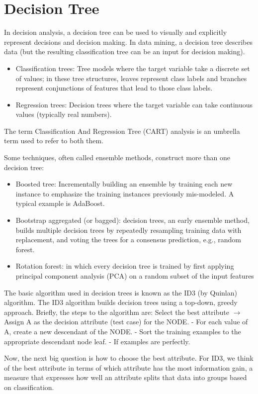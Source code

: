 \section{Decision Tree}
In decision analysis, a decision tree can be used to visually and explicitly represent decisions and decision making. In data mining, a decision tree describes data (but the resulting classification tree can be an input for decision making).
\begin{itemize}
    \item Classification trees: Tree models where the target variable take a discrete set of values; in these tree structures, leaves represent class labels and branches represent conjunctions of features that lead to those class labels. 
    \item Regression trees: Decision trees where the target variable can take continuous values (typically real numbers). 
\end{itemize}
The term Classification And Regression Tree (CART) analysis is an umbrella term used to refer to both them.

Some techniques, often called ensemble methods, construct more than one decision tree:
\begin{itemize}
    \item Boosted tree: Incrementally building an ensemble by training each new instance to emphasize the training instances previously mis-modeled. A typical example is AdaBoost.
    \item Bootstrap aggregated (or bagged): decision trees, an early ensemble method, builds multiple decision trees by repeatedly resampling training data with replacement, and voting the trees for a consensus prediction, e.g., random forest.
    \item Rotation forest: in which every decision tree is trained by first applying principal component analysis (PCA) on a random subset of the input features
\end{itemize}

The basic algorithm used in decision trees is known as the ID3 (by Quinlan) algorithm. The ID3 algorithm builds decision trees using a top-down, greedy approach. Briefly, the steps to the algorithm are: Select the best attribute $\rightarrow$ Assign A as the decision attribute (test case) for the NODE. - For each value of A, create a new descendant of the NODE. - Sort the training examples to the appropriate descendant node leaf. - If examples are perfectly.

Now, the next big question is how to choose the best attribute. For ID3, we think of the best attribute in terms of which attribute has the most information gain, a measure that expresses how well an attribute splits that data into groups based on classification.


